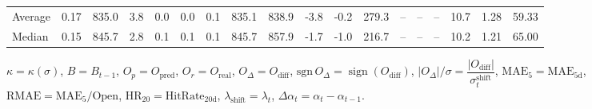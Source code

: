 \begin{threeparttable}
{\begin{tabular}{lrrrrrrrrrrrrrrrrr}
Average &     0.17 & 835.0 &               3.8 &               0.0 &                0.0 &                0.1 & 835.1 & 838.9 &       -3.8 &                     -0.2 &               279.3 &         -- &        -- &             -- &             10.7 &            1.28 &                  59.33 \\
 Median &     0.15 & 845.7 &               2.8 &               0.1 &                0.1 &                0.1 & 845.7 & 857.9 &       -1.7 &                     -1.0 &               216.7 &         -- &        -- &             -- &             10.2 &            1.21 &                  65.00 \\
\bottomrule
\end{tabular}
}
\begin{tablenotes}\footnotesize
\item $\kappa=\kappa(\sigma)$, $B=B_{t-1}$, $O_p=O_{\text{pred}}$, $O_r=O_{\text{real}}$, $O_\Delta=O_{\text{diff}}$, $\mathrm{sgn}\,O_\Delta=\operatorname{sign}(O_{\text{diff}})$, $|O_\Delta|/\sigma=\dfrac{|O_{\text{diff}}|}{\sigma_t^{\text{shift}}}$, $\mathrm{MAE}_5=\mathrm{MAE}_{5\text{d}}$, $\mathrm{RMAE}= \mathrm{MAE}_5 / \text{Open}$, $\mathrm{HR}_{20}=\mathrm{HitRate}_{20\text{d}}$, 
$\lambda_{\text{shift}}=\lambda_t$, 
$\Delta\alpha_t=\alpha_t-\alpha_{t-1}$.
\end{tablenotes}
\end{threeparttable}
\endgroup

